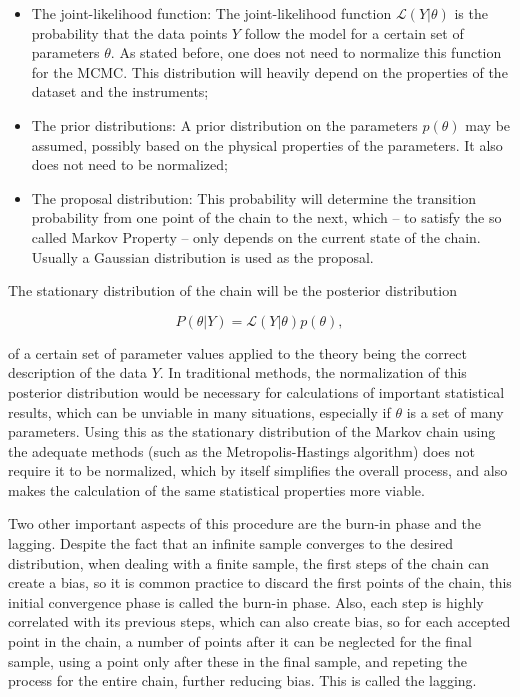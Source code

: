 \documentclass[openany,a4paper,12pt,oneside]{book}
\begin{document}
\begin{spacing}{1.5}
\begin{itemize}
	\item The joint-likelihood function: The joint-likelihood function $\mathcal{L}(Y|\theta)$ is the probability that the data points $Y$ follow the model for a certain set of parameters $\theta$. As stated before, one does not need to normalize this function for the MCMC. This distribution will heavily depend on the properties of the dataset and the instruments;
	\item The prior distributions: A prior distribution on the parameters $p(\theta)$ may be assumed, possibly based on the physical properties of the parameters. It also does not need to be normalized;
	\item The proposal distribution: This probability will determine the transition probability from one point of the chain to the next, which -- to satisfy the so called Markov Property -- only depends on the current state of the chain. Usually a Gaussian distribution is used as the proposal.
\end{itemize}

The stationary distribution of the chain will be the posterior distribution

\begin{equation}\label{posterior_MCMC}
	P(\theta|Y)=\mathcal{L}(Y|\theta)p(\theta),
\end{equation}

\noindent of a certain set of parameter values applied to the theory being the correct description of the data $Y$. In traditional methods, the normalization of this posterior distribution would be necessary for calculations of important statistical results, which can be unviable in many situations, especially if $\theta$ is a set of many parameters. Using this as the stationary distribution of the Markov chain using the adequate methods (such as the Metropolis-Hastings algorithm\cite{Metropolis_hastings}) does not require it to be normalized, which by itself simplifies the overall process, and also makes the calculation of the same statistical properties more viable.

Two other important aspects of this procedure are the burn-in phase and the lagging. Despite the fact that an infinite sample converges to the desired distribution, when dealing with a finite sample, the first steps of the chain can create a bias, so it is common practice to discard the first points of the chain, this initial convergence phase is called the burn-in phase. Also, each step is highly correlated with its previous steps, which can also create bias, so for each accepted point in the chain, a number of points after it can be neglected for the final sample, using a point only after these in the final sample, and repeting the process for the entire chain, further reducing bias. This is called the lagging.


\end{spacing}
\end{document}
